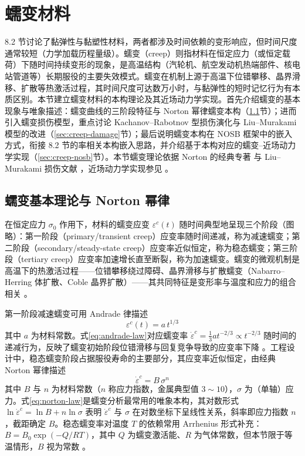 \section{蠕变材料}\label{sec:creep}

8.2 节讨论了黏弹性与黏塑性材料，两者都涉及时间依赖的变形响应，但时间尺度通常较短（力学加载历程量级）。蠕变（creep）则指材料在恒定应力（或恒定载荷）下随时间持续变形的现象，是高温结构（汽轮机、航空发动机热端部件、核电站管道等）长期服役的主要失效模式。蠕变在机制上源于高温下位错攀移、晶界滑移、扩散等热激活过程，其时间尺度可达数万小时，与黏弹性的短时记忆行为有本质区别。本节建立蠕变材料的本构理论及其近场动力学实现。首先介绍蠕变的基本现象与唯象描述：蠕变曲线的三阶段特征与 Norton 幂律蠕变本构（\ref{sec:creep-theory}节）；进而引入蠕变损伤模型，重点讨论 Kachanov--Rabotnov 型损伤演化与 Liu--Murakami 模型的改进（\ref{sec:creep-damage}节）；最后说明蠕变本构在 NOSB 框架中的嵌入方式，衔接 8.2 节的率相关本构嵌入思路，并介绍基于本构对应的蠕变--近场动力学实现（\ref{sec:creep-nosb}节）。本节蠕变理论依据 Norton 的经典专著 \cite{Norton1929} 与 Liu--Murakami 损伤文献 \cite{LiuMurakami1998,MurakamiLiu1995}，近场动力学实现参见 \cite{KulkarniTabarraei2020}。

\subsection{蠕变基本理论与 Norton 幂律}\label{sec:creep-theory}

在恒定应力 $\sigma_{0}$ 作用下，材料的蠕变应变 $\varepsilon^{c}(t)$ 随时间典型地呈现三个阶段（图略）：第一阶段（primary/transient creep）应变率随时间递减，称为减速蠕变；第二阶段（secondary/steady-state creep）应变率近似恒定，称为稳态蠕变；第三阶段（tertiary creep）应变率加速增长直至断裂，称为加速蠕变。蠕变的微观机制是高温下的热激活过程——位错攀移绕过障碍、晶界滑移与扩散蠕变（Nabarro--Herring 体扩散、Coble 晶界扩散）——其共同特征是变形率与温度和应力的组合相关 \cite{Norton1929}。

第一阶段减速蠕变可用 Andrade 律描述
\begin{equation}
  \varepsilon^{c}(t)=a\,t^{1/3}
  \label{eq:andrade-law}
\end{equation}
其中 $a$ 为材料常数。式\eqref{eq:andrade-law}对应蠕变率 $\dot{\varepsilon}^{c}=\tfrac{1}{3}at^{-2/3}\propto t^{-2/3}$ 随时间的递减行为，反映了蠕变初始阶段位错滑移与回复竞争导致的应变率下降 \cite{Norton1929}。工程设计中，稳态蠕变阶段占据服役寿命的主要部分，其应变率近似恒定，由经典 Norton 幂律描述 \cite{Norton1929}
\begin{equation}
  \dot{\varepsilon}^{c}=B\,\sigma^{n}
  \label{eq:norton-law}
\end{equation}
其中 $B$ 与 $n$ 为材料常数（$n$ 称应力指数，金属典型值 $3\sim 10$），$\sigma$ 为（单轴）应力。式\eqref{eq:norton-law}是蠕变分析最常用的唯象本构，其对数形式 $\ln\dot{\varepsilon}^{c}=\ln B+n\ln\sigma$ 表明 $\dot{\varepsilon}^{c}$ 与 $\sigma$ 在对数坐标下呈线性关系，斜率即应力指数 $n$，截距确定 $B$。稳态蠕变率对温度 $T$ 的依赖常用 Arrhenius 形式补充：$B=B_{0}\exp(-Q/RT)$，其中 $Q$ 为蠕变激活能、$R$ 为气体常数，但本节限于等温情形，$B$ 视为常数 \cite{Norton1929}。

